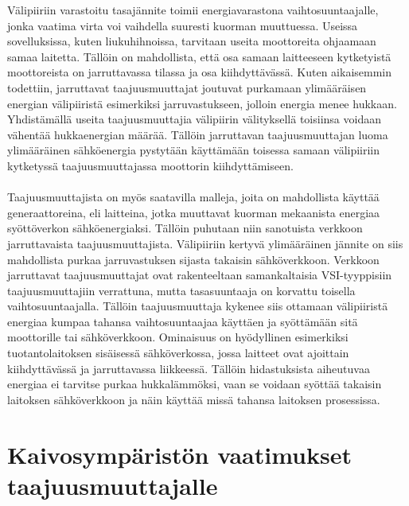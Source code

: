 \documentclass[finnish,12pt,a4paper,pdftex,elec,utf8]{aaltothesis}
\begin{document}
\noindent
Välipiiriin varastoitu tasajännite toimii energiavarastona vaihtosuuntaajalle, jonka vaatima virta voi vaihdella suuresti kuorman muuttuessa. Useissa sovelluksissa, kuten liukuhihnoissa, tarvitaan useita moottoreita ohjaamaan samaa laitetta. Tällöin on mahdollista, että osa samaan laitteeseen kytketyistä moottoreista on jarruttavassa tilassa ja osa kiihdyttävässä. Kuten aikaisemmin todettiin, jarruttavat taajuusmuuttajat joutuvat purkamaan ylimääräisen energian välipiiristä esimerkiksi jarruvastukseen, jolloin energia menee hukkaan. Yhdistämällä useita taajuusmuuttajia välipiirin välityksellä toisiinsa voidaan vähentää hukkaenergian määrää. Tällöin jarruttavan taajuusmuuttajan luoma ylimääräinen sähköenergia pystytään käyttämään toisessa samaan välipiiriin kytketyssä taajuusmuuttajassa moottorin kiihdyttämiseen. \cite{ABBtechnicalguide}
\\\\
Taajuusmuuttajista on myös saatavilla malleja, joita on mahdollista käyttää generaattoreina, eli laitteina, jotka muuttavat kuorman mekaanista energiaa syöttöverkon sähköenergiaksi. Tällöin puhutaan niin sanotuista verkkoon jarruttavaista taajuusmuuttajista. Välipiiriin kertyvä ylimääräinen jännite on siis mahdollista purkaa jarruvastuksen sijasta takaisin sähköverkkoon. Verkkoon jarruttavat taajuusmuuttajat ovat rakenteeltaan samankaltaisia VSI-tyyppisiin taajuusmuuttajiin verrattuna, mutta tasasuuntaaja on korvattu toisella vaihtosuuntaajalla. Tällöin taajuusmuuttaja kykenee siis ottamaan välipiiristä energiaa kumpaa tahansa vaihtosuuntaajaa käyttäen ja syöttämään sitä moottorille tai sähköverkkoon. Ominaisuus on hyödyllinen esimerkiksi tuotantolaitoksen sisäisessä sähköverkossa, jossa laitteet ovat ajoittain kiihdyttävässä ja jarruttavassa liikkeessä. Tällöin hidastuksista aiheutuvaa energiaa ei tarvitse purkaa hukkalämmöksi, vaan se voidaan syöttää takaisin laitoksen sähköverkkoon ja näin käyttää missä tahansa laitoksen prosessissa. \cite{ABBtechnicalguide}




\clearpage

\section{{\large Kaivosympäristön vaatimukset taajuusmuuttajalle}}
\end{document}
